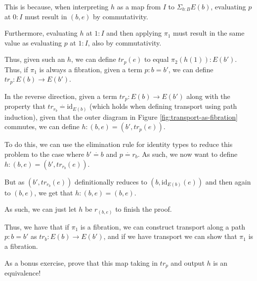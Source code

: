 \documentclass{amsart}
\theoremstyle{definition}
\newcommand{\defeq}{\ensuremath{\overset{\boldsymbol{\cdot}}{=}}}
\begin{document}
This is because, when interpreting $h$ as a map from $I$ to $\Sigma_{b : B} E(b)$, evaluating $p$ at $0 : I$ must result in $(b, e)$ by commutativity.

Furthermore, evaluating $h$ at $1 : I$ and then applying $\pi_1$ must result in the same value as evaluating $p$ at $1 : I$, also by commutativity.

Thus, given such an $h$, we can define $tr_p (e)$ to equal $\pi_2 (h (1)) : E(b')$. Thus, if $\pi_1$ is always a fibration, given a term $p : b = b'$, we can define $tr_p : E(b) \to E(b')$.

In the reverse direction, given a term $tr_p : E(b) \to E(b')$ along with the property that $tr_{r_b} \defeq \text{id}_{E(b)}$ (which holds when defining transport using path induction), given that the outer diagram in Figure \ref{fig:transport-as-fibration} commutes, we can define $h : (b, e) = (b', tr_p (e))$.

To do this, we can use the elimination rule for identity types to reduce this problem to the case where $b' \defeq b$ and $p \defeq r_b$. As such, we now want to define $h : (b, e) = (b', tr_{r_b} (e))$.

But as $(b', tr_{r_b} (e))$ definitionally reduces to $(b, \text{id}_{E(b)} (e))$ and then again to $(b, e)$, we get that $h : (b, e) = (b, e)$.

As such, we can just let $h$ be $r_{(b, e)}$ to finish the proof.

Thus, we have that if $\pi_1$ is a fibration, we can construct transport along a path $p : b = b'$ as $tr_b : E(b) \to E(b')$, and if we have transport we can show that $\pi_1$ is a fibration.

As a bonus exercise, prove that this map taking in $tr_p$ and output $h$ is an equivalence!
\end{document}
